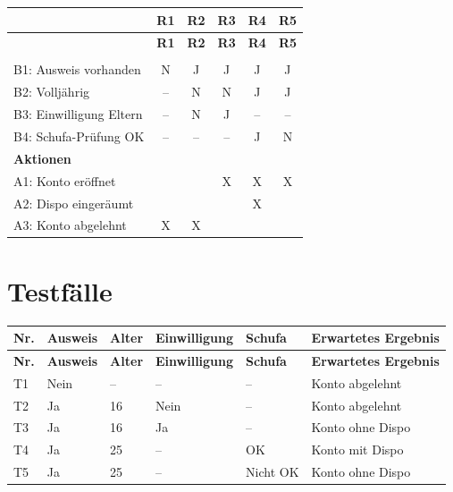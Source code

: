 \documentclass[
	fontsize=12pt,          %
	paper=a4,               %
	numbers=noenddot,       %
	listof=totoc,           %
	listof=entryprefix,     %
	listof=nochaptergap,    %
	bibliography=totoc,     %
	parskip=half,           %
	openany                 %
]{scrbook}
\begin{document}
\begin{longtable}{| p{4.5cm} | c | c | c | c | c |}
	\hline
	& \textbf{R1} & \textbf{R2} & \textbf{R3} & \textbf{R4} & \textbf{R5} \\ \hline
	\endfirsthead
	\hline
	& \textbf{R1} & \textbf{R2} & \textbf{R3} & \textbf{R4} & \textbf{R5} \\ \hline
	\endhead
	\hline
	\endfoot
	\multicolumn{6}{|l|}{\textbf{Bedingungen}} \\ \hline
	B1: Ausweis vorhanden & N & J & J & J & J \\ \hline
	B2: Volljährig & -- & N & N & J & J \\ \hline
	B3: Einwilligung Eltern & -- & N & J & -- & -- \\ \hline
	B4: Schufa-Prüfung OK & -- & -- & -- & J & N \\ \hline
	\multicolumn{6}{|l|}{\textbf{Aktionen}} \\ \hline
	A1: Konto eröffnet & & & X & X & X \\ \hline
	A2: Dispo eingeräumt & & & & X & \\ \hline
	A3: Konto abgelehnt & X & X & & & \\ \hline
\end{longtable}

\section*{Testfälle}

\begin{longtable}{| p{0.5cm} | p{1.5cm} | p{1.5cm} | p{2.0cm} | p{1.5cm} | p{4.5cm} |}
	\hline
	\textbf{Nr.} & \textbf{Ausweis} & \textbf{Alter} & \textbf{Einwilligung} & \textbf{Schufa} & \textbf{Erwartetes Ergebnis} \\ \hline
	\endfirsthead
	\hline
	\textbf{Nr.} & \textbf{Ausweis} & \textbf{Alter} & \textbf{Einwilligung} & \textbf{Schufa} & \textbf{Erwartetes Ergebnis} \\ \hline
	\endhead
	\hline
	\endfoot
	T1 & Nein & -- & -- & -- & Konto abgelehnt \\ \hline
	T2 & Ja & 16 & Nein & -- & Konto abgelehnt \\ \hline
	T3 & Ja & 16 & Ja & -- & Konto ohne Dispo \\ \hline
	T4 & Ja & 25 & -- & OK & Konto mit Dispo \\ \hline
	T5 & Ja & 25 & -- & Nicht OK & Konto ohne Dispo \\ \hline
\end{longtable}
\end{document}
